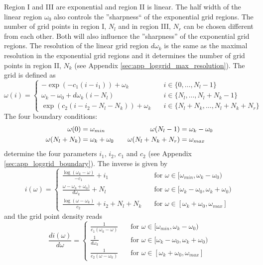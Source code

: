 Region I and III are exponential and region II is linear. The half width of the linear region $\omega_0$ also controls the ''sharpness`` of the exponential grid regions. The number of grid points in region I, $N_l$ and in region III, $N_r$ can be chosen different from each other. Both will also influence the ''sharpness'' of the exponential grid regions. The resolution of the linear grid region $d\omega_k$ is the same as the maximal resolution in the exponential grid regions and it determines the number of grid points in region II, $N_k$ (see Appendix \ref{sec:app_loggrid_max_resolution}). The grid is defined as
\begin{equation}\label{eqn:loggrid_definition}
	\omega(i)=\begin{cases}
		-\exp(-c_1(i-i_1)) + \omega_k 		\quad & i\in\{0,\dots,N_l-1\} \\ 
		\omega_k-\omega_0+d\omega_k(i-N_l)	\quad & i\in\{N_l,\dots,N_l+N_k-1\} \\ 
		\exp(c_2(i-i_2-N_l-N_k)) + \omega_k 	\quad & i\in\{N_l+N_k,\dots,N_l+N_k+N_r\}
	\end{cases}
\end{equation}
The four boundary conditions:
\begin{align}\label{eqn:loggrid_boundary_conditions}
	\omega(0)&=\omega_{min} \quad &\omega(N_l-1)&=\omega_k-\omega_0 \notag \\
	\omega(N_l+N_k)&=\omega_k+\omega_0 \quad &\omega(N_l+N_k+N_r)&=\omega_{max}
\end{align}
determine the four parameters $i_1$, $i_2$, $c_1$ and $c_2$ (see Appendix \ref{sec:app_loggrid_boundary}). The inverse is given by
\[
	i(\omega)=\begin{cases}
		\frac{\log(\omega_k-\omega)}{-c_1} + i_1 \quad &\text{for } \omega\in[\omega_{min},\omega_k-\omega_0) \\
		\frac{\omega-\omega_k+\omega_0)}{d\omega_k} + N_l \quad &\text{for } \omega\in[\omega_k-\omega_0,\omega_k+\omega_0) \\
		\frac{\log(\omega-\omega_k)}{c_2} + i_2 + N_l + N_k \quad &\text{for } \omega\in[\omega_k+\omega_0, \omega_{max}]
	\end{cases}
\]
and the grid point density reads
\begin{equation}\label{eqn:loggrid_grid_point_density}
	\frac{di(\omega)}{d\omega}=\begin{cases}
		\frac{1}{c_1(\omega_k-\omega)} \quad &\text{for } \omega\in[\omega_{min},\omega_k-\omega_0) \\
		\frac{1}{d\omega_k} \quad &\text{for } \omega\in[\omega_k-\omega_0,\omega_k+\omega_0) \\
		\frac{1}{c_2(\omega-\omega_k)}  \quad &\text{for } \omega\in[\omega_k+\omega_0, \omega_{max}]
	\end{cases}
\end{equation}

